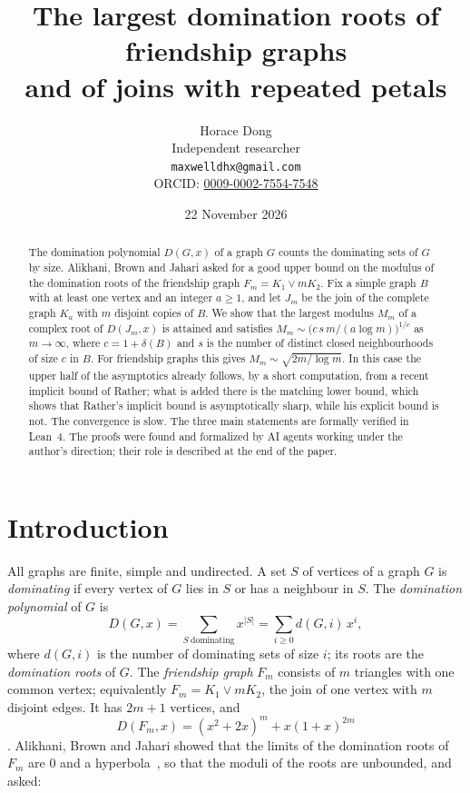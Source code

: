 \documentclass[11pt]{article}
\title{The largest domination roots of friendship graphs\\ and of joins with repeated petals}
\author{Horace Dong\\ \small Independent researcher\\
\small\texttt{maxwelldhx@gmail.com}\\
\small ORCID: \href{https://orcid.org/0009-0002-7554-7548}{0009-0002-7554-7548}}
\date{22 November 2026}
\theoremstyle{definition}
\theoremstyle{remark}
\begin{document}
\maketitle

\begin{abstract}
The domination polynomial $D(G,x)$ of a graph $G$ counts the dominating sets
of $G$ by size. Alikhani, Brown and Jahari asked for a good upper bound on the
modulus of the domination roots of the friendship graph $F_m=K_1\vee mK_2$.
Fix a simple graph $B$ with at least one vertex and an integer $a\ge1$, and let $J_m$ be the
join of the complete graph $K_a$ with $m$ disjoint copies of $B$. We show that
the largest modulus $M_m$ of a complex root of $D(J_m,x)$ is attained and
satisfies $M_m\sim\bigl(c\,s\,m/(a\log m)\bigr)^{1/c}$ as $m\to\infty$, where
$c=1+\delta(B)$ and $s$ is the number of distinct closed neighbourhoods of size
$c$ in $B$. For friendship graphs this gives $M_m\sim\sqrt{2m/\log m}$. In
this case the upper half of the asymptotics already follows, by a short
computation, from a recent implicit bound of Rather; what is added there is
the matching lower bound, which shows that Rather's implicit bound is
asymptotically sharp, while his explicit bound is not. The convergence is
slow. The three main statements are formally verified in Lean~4. The proofs
were found and formalized by AI agents working under the author's direction;
their role is described at the end of the paper.
\end{abstract}

\section{Introduction}

All graphs are finite, simple and undirected. A set $S$ of vertices of a graph
$G$ is \emph{dominating} if every vertex of $G$ lies in $S$ or has a neighbour
in $S$. The \emph{domination polynomial} of $G$ is
\[
D(G,x)=\sum_{S\ \text{dominating}} x^{|S|}=\sum_{i\ge0} d(G,i)\,x^i ,
\]
where $d(G,i)$ is the number of dominating sets of size $i$; its roots are the
\emph{domination roots} of $G$. The \emph{friendship graph} $F_m$ consists of
$m$ triangles with one common vertex; equivalently $F_m=K_1\vee mK_2$, the
join of one vertex with $m$ disjoint edges. It has $2m+1$ vertices, and
\begin{equation}\label{eq:friend}
D(F_m,x)=(x^2+2x)^m+x(1+x)^{2m}
\end{equation}
\cite[Theorem~2.1]{abj}. Alikhani, Brown and Jahari showed that the limits of
the domination roots of $F_m$ are $0$ and a hyperbola~\cite[Theorem~2.5]{abj},
so that the moduli of the roots are unbounded, and asked:
\end{document}
